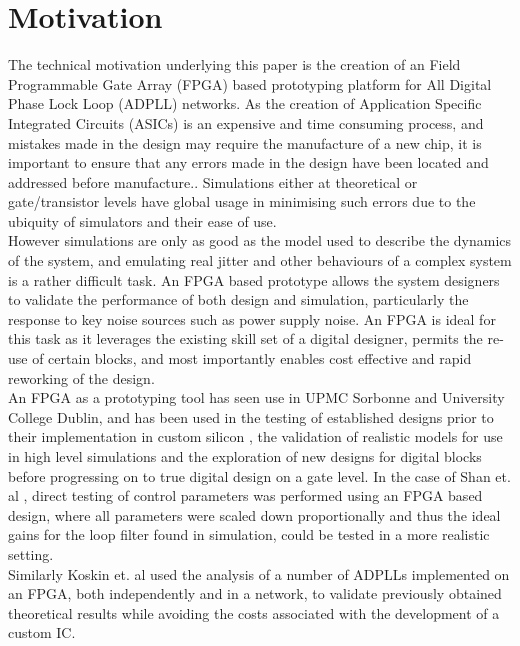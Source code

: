 \documentclass[conference]{IEEEtran}
\begin{document}
\section{Motivation}
The technical motivation underlying this paper is the creation of an Field Programmable Gate Array (FPGA) based prototyping platform for All Digital Phase Lock Loop (ADPLL) networks. As the creation of Application Specific Integrated Circuits (ASICs) is an expensive and time consuming process, and mistakes made in the design may require the manufacture of a new chip, it is important to ensure that any errors made in the design have been located and addressed before manufacture..
Simulations either at theoretical or gate/transistor levels have global usage in minimising such errors due to the ubiquity of simulators and their ease of use.\\
However simulations are only as good as the model used to describe the dynamics of the system, and emulating real jitter and other behaviours of a complex system is a rather difficult task. %
An FPGA based prototype allows the system designers to validate the performance of both design and simulation, particularly the response to key noise sources such as power supply noise. An FPGA is ideal for this task as it leverages the existing skill set of a digital designer, permits the re-use of certain blocks, and most importantly enables cost effective and rapid reworking of the design.\\
An FPGA as a prototyping tool has seen use in UPMC Sorbonne and University College Dublin, and has been used in the testing of established designs prior to their implementation in custom silicon \cite{zianbetov2013phd,shan2014phd}, the validation of realistic models for use in high level simulations\cite{theboys2019} and the exploration of new designs for digital blocks before progressing on to true digital design on a gate level.  %
In the case of Shan et. al \cite{shan2014phd}, direct testing of control parameters was performed using an FPGA based design, where all parameters were scaled down proportionally and thus the ideal gains for the loop filter found in simulation, could be tested in a more realistic setting.\\
Similarly Koskin et. al \cite{theboys2019} used the analysis of a number of ADPLLs implemented on an FPGA, both independently and in a network, to validate previously obtained theoretical results while avoiding the costs associated with the development of a custom IC.\\
\end{document}
